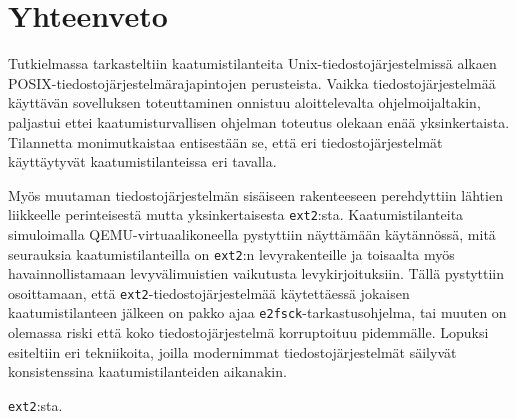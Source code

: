 \section{Yhteenveto}
Tutkielmassa tarkasteltiin kaatumistilanteita Unix-tiedostojärjestelmissä alkaen POSIX-tiedostojärjestelmärajapintojen perusteista.
Vaikka tiedostojärjestelmää käyttävän sovelluksen toteuttaminen onnistuu aloittelevalta ohjelmoijaltakin,
paljastui ettei kaatumisturvallisen ohjelman toteutus olekaan enää yksinkertaista.
Tilannetta monimutkaistaa entisestään se,
että eri tiedostojärjestelmät käyttäytyvät kaatumistilanteissa eri tavalla.

Myös muutaman tiedostojärjestelmän sisäiseen rakenteeseen perehdyttiin lähtien liikkeelle perinteisestä mutta yksinkertaisesta \texttt{ext2}:sta.
Kaatumistilanteita simuloimalla QEMU-virtuaalikoneella pystyttiin näyttämään käytännössä,
mitä seurauksia kaatumistilanteilla on \texttt{ext2}:n levyrakenteille
ja toisaalta myös havainnollistamaan levyvälimuistien vaikutusta levykirjoituksiin.
Tällä pystyttiin osoittamaan,
että \texttt{ext2}-tiedostojärjestelmää käytettäessä jokaisen kaatumistilanteen jälkeen on pakko ajaa \texttt{e2fsck}-tarkastusohjelma,
tai muuten on olemassa riski että koko tiedostojärjestelmä korruptoituu pidemmälle.
Lopuksi esiteltiin eri tekniikoita,
joilla modernimmat tiedostojärjestelmät säilyvät konsistenssina kaatumistilanteiden aikanakin.

\texttt{ext2}:sta.
